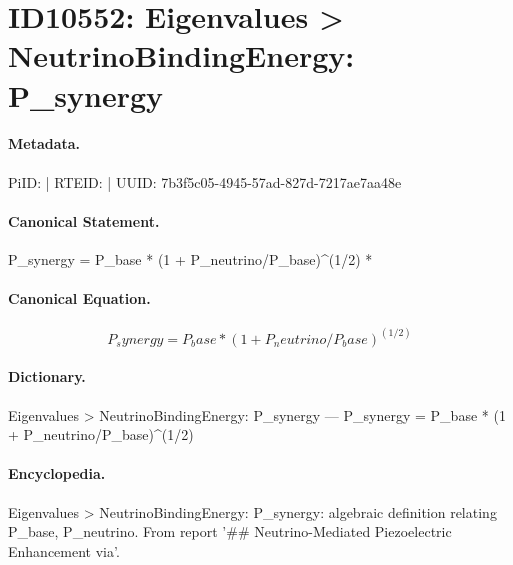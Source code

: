 \section*{ID10552: Eigenvalues > NeutrinoBindingEnergy: P\_synergy}
\paragraph{Metadata.}
PiID:  | RTEID:  | UUID: 7b3f5c05-4945-57ad-827d-7217ae7aa48e

\paragraph{Canonical Statement.}
P\_synergy = P\_base * (1 + P\_neutrino/P\_base)\textasciicircum{}(1/2) *

\paragraph{Canonical Equation.}
\[
P_synergy = P_base * (1 + P_neutrino/P_base)^(1/2)
\]

\paragraph{Dictionary.}
Eigenvalues > NeutrinoBindingEnergy: P\_synergy — P\_synergy = P\_base * (1 + P\_neutrino/P\_base)\textasciicircum{}(1/2)

\paragraph{Encyclopedia.}
Eigenvalues > NeutrinoBindingEnergy: P\_synergy: algebraic definition relating P\_base, P\_neutrino. From report '\#\# Neutrino-Mediated Piezoelectric Enhancement via'.
